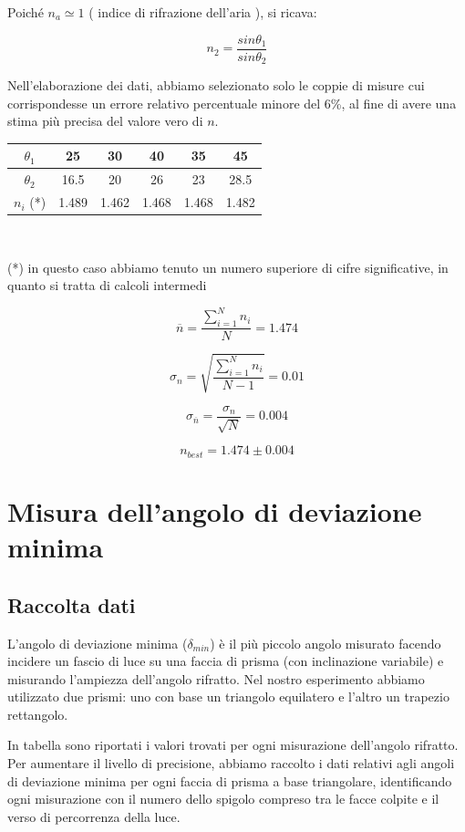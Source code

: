 \documentclass[a4paper,10pt]{report}
\begin{document}
Poiché $n_a \simeq1 $ ( indice di rifrazione dell'aria ), si ricava:

$$n_2 = \frac{sin\theta_1}{sin\theta_2}$$

Nell'elaborazione dei dati, abbiamo selezionato solo le coppie di misure cui corrispondesse un errore relativo percentuale minore del 6\%, al fine di avere una stima più precisa del valore vero di $n$.

\begin{center}
\begin{tabular}{c|c|c|c|c|c}
\textbf{$\theta_1$} & 25 & 30 & 40 & 35 & 45\\
\midrule
\textbf{$\theta_2$} & 16.5 & 20 & 26 & 23 & 28.5\\
\midrule
\textbf{$n_i$} (*) & 1.489 & 1.462 & 1.468 & 1.468 & 1.482\\
\end{tabular}\\

\end{center}
(*) in questo caso abbiamo tenuto un numero superiore di cifre significative, in quanto si tratta di calcoli intermedi 

$$\overline{n} = \frac{\displaystyle\sum\limits_{i=1}^N n_i}{N} = 1.474 $$

$$\sigma_n = \sqrt{\frac{\sum_{i=1}^N n_i}{N-1}} = 0.01$$

$$\sigma_{\overline{n}} = \frac{\sigma_n}{\sqrt{N}} = 0.004$$

$$n_{best} = 1.474  \pm 0.004 $$


\section{Misura dell'angolo di deviazione minima}
\subsection{Raccolta dati}

L'angolo di deviazione minima ($\delta_{min}$) è il più piccolo angolo misurato facendo incidere un fascio di luce su una faccia di prisma (con inclinazione variabile) e misurando l'ampiezza dell'angolo rifratto. Nel nostro esperimento abbiamo utilizzato due prismi: uno con base un triangolo equilatero e l'altro un trapezio rettangolo.

In tabella sono riportati i valori trovati per ogni misurazione dell'angolo rifratto. Per aumentare il livello di precisione, abbiamo raccolto i dati relativi agli angoli di deviazione minima per ogni faccia di prisma a base triangolare, identificando ogni misurazione con il numero dello spigolo compreso tra le facce colpite e il verso di percorrenza della luce.
\end{document}
